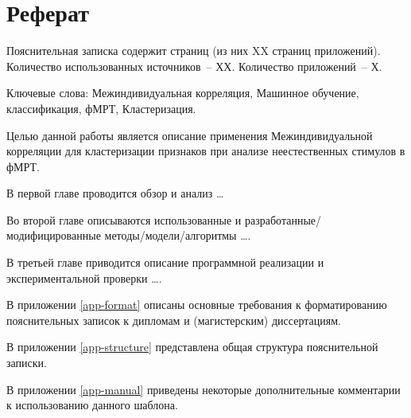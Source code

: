 \chapter*{Реферат}

Пояснительная записка содержит страниц (из них XX страниц приложений).   Количество использованных источников~-- ХХ. Количество приложений~-- Х.

Ключевые слова: Межиндивидуальная корреляция, Машинное обучение, классификация, фМРТ, Кластеризация.

Целью данной работы является описание применения Межиндивидуальной корреляции для кластеризации признаков при анализе неестественных стимулов в фМРТ.

В первой главе проводится обзор и анализ \dots 

Во второй главе описываются использованные и разработанные/модифицированные методы/модели/алгоритмы \dots. 

В третьей главе приводится описание программной реализации и экспериментальной проверки \dots.

В приложении \ref{app-format} описаны основные требования к форматированию пояснительных записок к дипломам и (магистерским) диссертациям.

В приложении \ref{app-structure} представлена общая структура пояснительной записки.

В приложении \ref{app-manual} приведены некоторые дополнительные комментарии к использованию данного шаблона.
